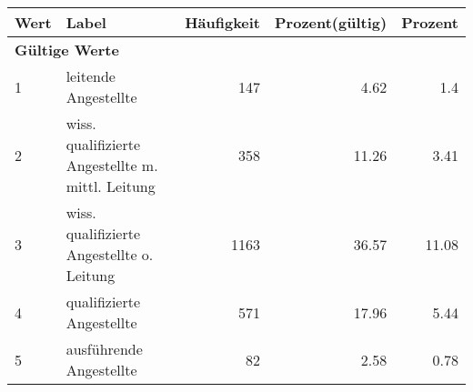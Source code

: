      \begin{longtable}{lXrrr}
     \toprule
     \textbf{Wert} & \textbf{Label} & \textbf{Häufigkeit} & \textbf{Prozent(gültig)} & \textbf{Prozent} \\
     \endhead
     \midrule
     \multicolumn{5}{l}{\textbf{Gültige Werte}}\\

     1 &
     \multicolumn{1}{X}{ leitende Angestellte   } &


       \num{147} &
       \num[round-mode=places,round-precision=2]{4.62} &
         \num[round-mode=places,round-precision=2]{1.4} \\

     2 &
     \multicolumn{1}{X}{ wiss. qualifizierte Angestellte m. mittl. Leitung   } &


       \num{358} &
       \num[round-mode=places,round-precision=2]{11.26} &
         \num[round-mode=places,round-precision=2]{3.41} \\

     3 &
     \multicolumn{1}{X}{ wiss. qualifizierte Angestellte o. Leitung   } &


       \num{1163} &
       \num[round-mode=places,round-precision=2]{36.57} &
         \num[round-mode=places,round-precision=2]{11.08} \\

     4 &
     \multicolumn{1}{X}{ qualifizierte Angestellte   } &


       \num{571} &
       \num[round-mode=places,round-precision=2]{17.96} &
         \num[round-mode=places,round-precision=2]{5.44} \\

     5 &
     \multicolumn{1}{X}{ ausführende Angestellte   } &


       \num{82} &
       \num[round-mode=places,round-precision=2]{2.58} &
         \num[round-mode=places,round-precision=2]{0.78} \\


\end{longtable}
